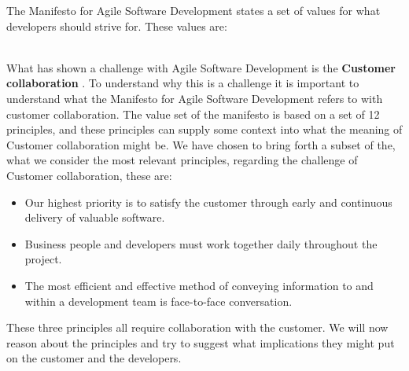 The Manifesto for Agile Software Development states a set of values for what developers should strive for. These values are: \\
\noindent\hrulefill\par
\noindent{} \\
What has shown a challenge with Agile Software Development is the \textbf{Customer collaboration} \cite{Hoda2011TheIO}. 
To understand why this is a challenge it is important to understand what the Manifesto for Agile Software Development refers to with customer collaboration. 
The value set of the manifesto is based on a set of 12 principles, and these principles can supply some context into what the meaning of Customer collaboration might be.
We have chosen to bring forth a subset of the, what we consider the most relevant principles, regarding the challenge of Customer collaboration, these are:

\begin{itemize}
  \item Our highest priority is to satisfy the customer through early and continuous delivery of valuable software.
  \item Business people and developers must work together daily throughout the project.
  \item The most efficient and effective method of conveying information to and within a development team is face-to-face conversation.
\end{itemize}

These three principles all require collaboration with the customer.
We will now reason about the principles and try to suggest what implications they might put on the customer and the developers.

